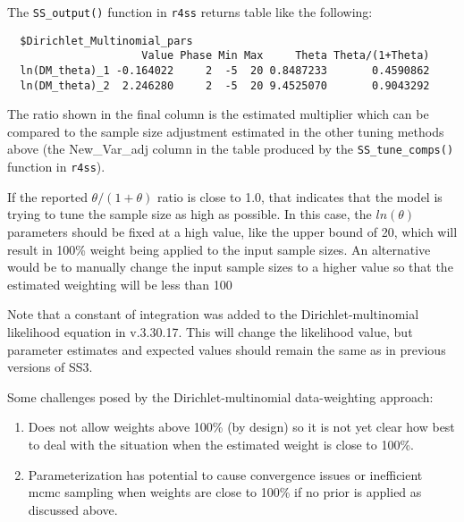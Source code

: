 The \texttt{SS\_output()} function in \texttt{r4ss} returns table like the following:
\begin{small}
\begin{verbatim}
  $Dirichlet_Multinomial_pars
                     Value Phase Min Max     Theta Theta/(1+Theta)
  ln(DM_theta)_1 -0.164022     2  -5  20 0.8487233       0.4590862
  ln(DM_theta)_2  2.246280     2  -5  20 9.4525070       0.9043292
\end{verbatim}
\end{small}

The ratio shown in the final column is the estimated multiplier which can be compared to the sample size adjustment estimated in the other tuning methods above (the New\_Var\_adj column in the table produced by the \texttt{SS\_tune\_comps()} function in \texttt{r4ss}).

If the reported $\theta/(1+\theta)$ ratio is close to 1.0, that indicates that the model is trying to tune the sample size as high as possible. In this case, the $ln(\theta)$ parameters should be fixed at a high value, like the upper bound of 20, which will result in 100\% weight being applied to the input sample sizes. An alternative would be to manually change the input sample sizes to a higher value so that the estimated weighting will be less than 100%

Note that a constant of integration was added to the Dirichlet-multinomial likelihood equation in v.3.30.17. This will change the likelihood value, but parameter estimates and expected values should remain the same as in previous versions of SS3.

Some challenges posed by the Dirichlet-multinomial data-weighting approach:
\begin{enumerate}
	\item Does not allow weights above 100\% (by design) so it is not yet clear how best to deal with the situation when the estimated weight is close to 100\%.
	\item Parameterization has potential to cause convergence issues or inefficient \gls{mcmc} sampling when weights are close to 100\% if no prior is applied as discussed above.
\end{enumerate}
